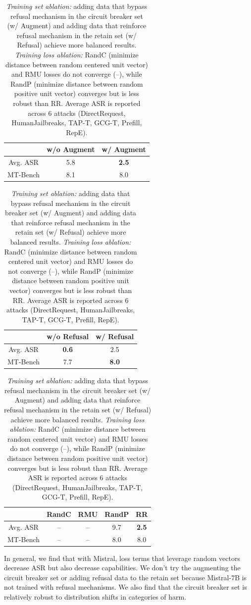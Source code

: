 \begin{table}[]
\centering
\caption{\emph{Training set ablation:} adding data that bypass refusal mechanism in the circuit breaker set (w/ Augment) and adding data that reinforce refusal mechanism in the retain set (w/ Refusal) achieve more balanced results. \emph{Training loss ablation:} RandC (minimize distance between random centered unit vector) and RMU losses do not converge (--), while RandP (minimize distance between random positive unit vector) converges but is less robust than RR. Average ASR is reported across 6 attacks (DirectRequest, HumanJailbreaks, TAP-T, GCG-T, Prefill, RepE).}
\setlength{\tabcolsep}{4pt}

\begin{tabular}{@{}ccc@{}}
\toprule
 & w/o Augment & w/ Augment \\
\midrule 
Avg. ASR & 5.8 & \textbf{2.5} \\ 
MT-Bench & 8.1 & 8.0 \\
\bottomrule
\end{tabular}

\vspace{10pt} %

\begin{tabular}{@{}ccc@{}}
\toprule
 & w/o Refusal & w/ Refusal \\
\midrule
Avg. ASR & \textbf{0.6} & 2.5 \\ 
MT-Bench & 7.7 & \textbf{8.0} \\
\bottomrule
\end{tabular}

\vspace{10pt} %

\begin{tabular}{@{}ccccc@{}}
\toprule
 & RandC & RMU & RandP & RR \\
\midrule 
Avg. ASR & -- & -- & 9.7 & \textbf{2.5} \\ 
MT-Bench & -- & -- & 8.0 & 8.0 \\
\bottomrule

\end{tabular}
\label{tab:training_loss_ablation}
\end{table}

In general, we find that with Mistral, loss terms that leverage random vectors decrease ASR but also decrease capabilities. We don't try the augmenting the circuit breaker set or adding refusal data to the retain set because Mistral-7B is not trained with refusal mechanisms. We also find that the circuit breaker set is relatively robust to distribution shifts in categories of harm. 




